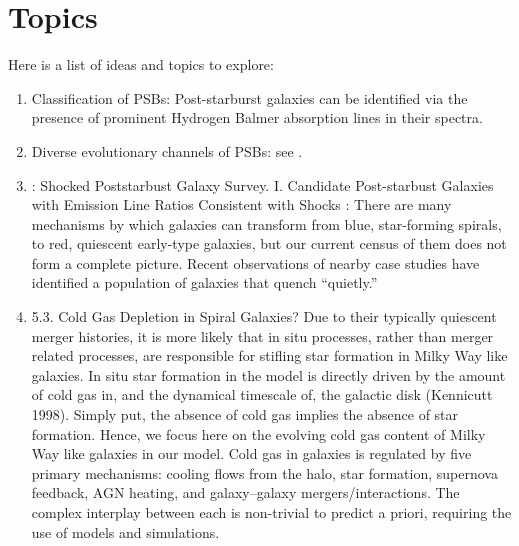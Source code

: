 \section{Topics}
Here is a list of ideas and topics to explore:
\begin{enumerate}
    \item Classification of PSBs: Post-starburst galaxies can be identified via the presence of prominent Hydrogen Balmer absorption lines in their spectra. 
    \item Diverse evolutionary channels of PSBs: see \citet{2019NatAs...3..440P}.
    \item \citet{2016ApJS..224...38A} : Shocked Poststarbust Galaxy Survey. I. Candidate Post-starbust Galaxies with Emission Line Ratios Consistent with Shocks : There are many mechanisms by which galaxies can transform from blue, star-forming spirals, to red, quiescent early-type galaxies, but our current census of them does not form a complete picture. Recent observations of nearby case studies have identified a population of galaxies that quench “quietly.” 
    \item \citet{Mutch_2011} 5.3. Cold Gas Depletion in Spiral Galaxies? Due to their typically quiescent merger histories, it is more likely that in situ processes, rather than merger related processes, are responsible for stifling star formation in Milky Way like galaxies. In situ star formation in the model is directly driven by the amount of cold gas in, and the dynamical timescale of, the galactic disk (Kennicutt 1998). Simply put, the absence of cold gas implies the absence of star formation. Hence, we focus here on the evolving cold gas content of Milky Way like galaxies in our model.
    Cold gas in galaxies is regulated by five primary mechanisms: cooling flows from the halo, star formation, supernova feedback, AGN heating, and galaxy–galaxy mergers/interactions. The complex interplay between each is non-trivial to predict a priori, requiring the use of models and simulations.
\end{enumerate}